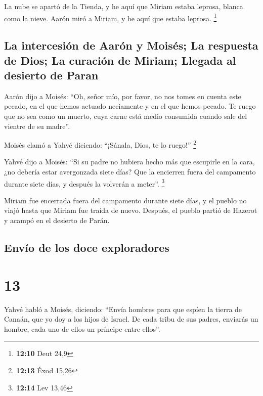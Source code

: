  La nube se apartó de la Tienda, y he aquí que Miriam
estaba leprosa, blanca como la nieve. Aarón miró a Miriam, y he aquí que
estaba leprosa. \footnote{\textbf{12:10} Deut 24,9}

\hypertarget{la-intercesiuxf3n-de-aaruxf3n-y-moisuxe9s-la-respuesta-de-dios-la-curaciuxf3n-de-miriam-llegada-al-desierto-de-paran}{%
\subsection{La intercesión de Aarón y Moisés; La respuesta de Dios; La
curación de Miriam; Llegada al desierto de
Paran}\label{la-intercesiuxf3n-de-aaruxf3n-y-moisuxe9s-la-respuesta-de-dios-la-curaciuxf3n-de-miriam-llegada-al-desierto-de-paran}}

 Aarón dijo a Moisés: ``Oh, señor mío, por favor, no nos
tomes en cuenta este pecado, en el que hemos actuado neciamente y en el
que hemos pecado.  Te ruego que no sea como un muerto,
cuya carne está medio consumida cuando sale del vientre de su madre''.

 Moisés clamó a Yahvé diciendo: ``¡Sánala, Dios, te lo
ruego!'' \footnote{\textbf{12:13} Éxod 15,26}

 Yahvé dijo a Moisés: ``Si su padre no hubiera hecho más
que escupirle en la cara, ¿no debería estar avergonzada siete días? Que
la encierren fuera del campamento durante siete días, y después la
volverán a meter''. \footnote{\textbf{12:14} Lev 13,46}

 Miriam fue encerrada fuera del campamento durante siete
días, y el pueblo no viajó hasta que Miriam fue traída de nuevo.
 Después, el pueblo partió de Hazerot y acampó en el
desierto de Parán.

\hypertarget{envuxedo-de-los-doce-exploradores}{%
\subsection{Envío de los doce
exploradores}\label{envuxedo-de-los-doce-exploradores}}

\hypertarget{section-12}{%
\section{13}\label{section-12}}

 Yahvé habló a Moisés, diciendo:  ``Envía
hombres para que espíen la tierra de Canaán, que yo doy a los hijos de
Israel. De cada tribu de sus padres, enviarás un hombre, cada uno de
ellos un príncipe entre ellos''.


